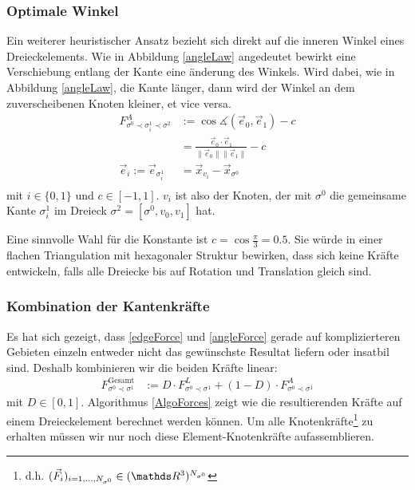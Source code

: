  \subsubsection{Optimale Winkel}
    Ein weiterer heuristischer Ansatz bezieht sich direkt auf die inneren Winkel eines Dreieckelements. 
    Wie in Abbildung \ref{angleLaw} angedeutet bewirkt eine Verschiebung entlang der Kante eine änderung des Winkels.
    Wird dabei, wie in Abbildung \ref{angleLaw}, die Kante länger, dann wird der Winkel an dem zuverscheibenen Knoten kleiner, et vice versa. 
    \begin{align}
       F^{A}_{\sigma^{0}\prec\sigma^{1}_{i}\prec\sigma^{2}} &:= \cos\measuredangle(\vec{e}_{0},\vec{e}_{1}) - c \label{angleForce}\\
                              &= \frac{\vec{e}_{0} \cdot \vec{e}_{1}}{\|\vec{e}_{0}\|\|\vec{e}_{1}\|} - c \\
       \vec{e}_{i} := \vec{e}_{\sigma^{1}_{i}} &= \vec{x}_{v_{i}} - \vec{x}_{\sigma^{0}}\\
    \end{align}
    mit \( i\in\{0,1\} \) und \( c\in[-1,1] \). 
    \( v_{i} \) ist also der Knoten, der mit \( \sigma^{0} \) die gemeinsame Kante \( \sigma^{1}_{i} \) 
    im Dreieck \( \sigma^{2} = [\sigma^{0},v_{0},v_{1}] \) hat.
    
    Eine sinnvolle Wahl für die Konstante ist \( c = \cos \frac{\pi}{3} = 0.5\).
    Sie würde in einer flachen Triangulation mit hexagonaler Struktur bewirken, dass sich keine Kräfte entwickeln, falls alle Dreiecke bis auf Rotation und Translation gleich sind.

  \subsubsection{Kombination der Kantenkräfte}
    Es hat sich gezeigt, dass \eqref{edgeForce} und \eqref{angleForce} gerade auf komplizierteren Gebieten einzeln entweder nicht das gewünschste Resultat liefern oder insatbil sind.
    Deshalb kombinieren wir die beiden Kräfte linear:
    \begin{align}
      F^{\text{Gesamt}}_{\sigma^{0}\prec\sigma^{1}} &:= D \cdot F^{L}_{\sigma^{0}\prec\sigma^{1}} + (1-D) \cdot F^{A}_{\sigma^{0}\prec\sigma^{1}}
    \end{align}
    mit \( D\in[0,1] \).
    Algorithmus \ref{AlgoForces} zeigt wie die resultierenden Kräfte auf einem Dreieckelement berechnet werden können. 
    Um alle Knotenkräfte\footnote{d.h. \((\vec{F}_{i})_{i=1,\ldots, N_{\sigma^{0}}}\in (\R^{3})^{N_{\sigma^{0}}} \)} zu erhalten müssen wir nur noch diese Element-Knotenkräfte aufassemblieren. 
    
